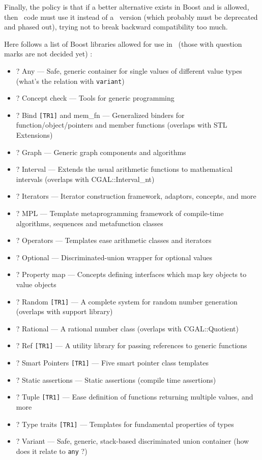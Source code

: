Finally, the policy is that if a better alternative exists in Boost and is
allowed, then \cgal\ code must use it instead of a \cgal\ version (which
probably must be deprecated and phased out), trying not to break backward
compatibility too much.

Here follows a list of Boost libraries allowed for use in \cgal\ (those
with question marks are not decided yet) :
\begin{itemize}
\item ? Any --- Safe, generic container for single values of different value
      types (what's the relation with \texttt{variant})
\item ? Concept check --- Tools for generic programming
\item ? Bind \texttt{[TR1]} and  mem\_fn --- Generalized binders for
      function/object/pointers and member functions (overlaps with STL
      Extensions)
\item ? Graph --- Generic graph components and algorithms
\item ? Interval --- Extends the usual arithmetic functions to mathematical intervals (overlaps with CGAL::Interval\_nt)
\item ? Iterators --- Iterator construction framework, adaptors, concepts, and more
\item ? MPL --- Template metaprogramming framework of compile-time algorithms, sequences and metafunction classes
\item ? Operators --- Templates ease arithmetic classes and iterators
\item ? Optional --- Discriminated-union wrapper for optional values
\item ? Property map --- Concepts defining interfaces which map key objects to value objects
\item ? Random \texttt{[TR1]} --- A complete system for random number generation
      (overlaps with support library)
\item ? Rational --- A rational number class (overlaps with CGAL::Quotient)
\item ? Ref \texttt{[TR1]} --- A utility library for passing references to generic functions
\item ? Smart Pointers \texttt{[TR1]} --- Five smart pointer class templates
\item ? Static assertions --- Static assertions (compile time assertions)
\item ? Tuple \texttt{[TR1]} --- Ease definition of functions returning multiple values, and more
\item ? Type traits \texttt{[TR1]} --- Templates for fundamental properties of types
\item ? Variant --- Safe, generic, stack-based discriminated union container
      (how does it relate to \texttt{any} ?)
\end{itemize}


